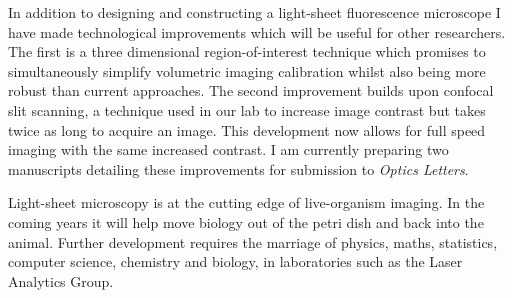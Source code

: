 In addition to designing and constructing a light-sheet fluorescence microscope I have made technological improvements which will be useful for other researchers.
The first is a three dimensional region-of-interest technique which promises to simultaneously simplify volumetric imaging calibration whilst also being more robust than current approaches.
The second improvement builds upon confocal slit scanning, a technique used in our lab to increase image contrast but takes twice as long to acquire an image.
This development now allows for full speed imaging with the same increased contrast.
I am currently preparing two manuscripts detailing these improvements for submission to \emph{Optics Letters}.

Light-sheet microscopy is at the cutting edge of live-organism imaging.
In the coming years it will help move biology out of the petri dish and back into the animal.
Further development requires the marriage of physics, maths, statistics, computer science, chemistry and biology, in laboratories such as the Laser Analytics Group.

